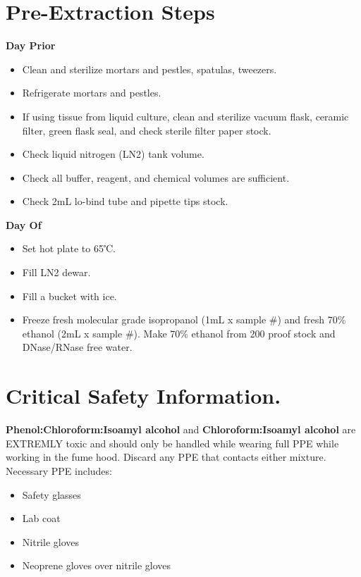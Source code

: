 \documentclass[
]{book}
\begin{document}
\hypertarget{pre-extraction-steps}{%
\section{Pre-Extraction Steps~}\label{pre-extraction-steps}}

\textbf{Day Prior}~

\begin{itemize}
\item
  Clean and sterilize mortars and pestles, spatulas, tweezers.~
\item
  Refrigerate mortars and pestles.
\item
  If using tissue from liquid culture, clean and sterilize vacuum flask, ceramic filter, green flask seal, and check sterile filter paper stock.~
\item
  Check liquid nitrogen (LN2) tank volume.~
\item
  Check all buffer, reagent, and chemical volumes are sufficient.~
\item
  Check 2mL lo-bind tube and pipette tips stock.~
\end{itemize}

\textbf{Day Of}~

\begin{itemize}
\item
  Set hot plate to 65℃.~
\item
  Fill LN2 dewar.~
\item
  Fill a bucket with ice.~
\item
  Freeze fresh molecular grade isopropanol (1mL x sample \#) and fresh 70\% ethanol (2mL x sample \#). Make 70\% ethanol from 200 proof stock and DNase/RNase free water.~
\end{itemize}

\hypertarget{critical-safety-information.}{%
\section{Critical Safety Information.~}\label{critical-safety-information.}}

\textbf{Phenol:Chloroform:Isoamyl alcohol} and \textbf{Chloroform:Isoamyl alcohol} are EXTREMLY toxic and should only be handled while wearing full PPE while working in the fume hood. Discard any PPE that contacts either mixture. Necessary PPE includes:~

\begin{itemize}
\item
  Safety glasses~
\item
  Lab coat~
\item
  Nitrile gloves~
\item
  Neoprene gloves over nitrile gloves~
\end{itemize}
\end{document}
